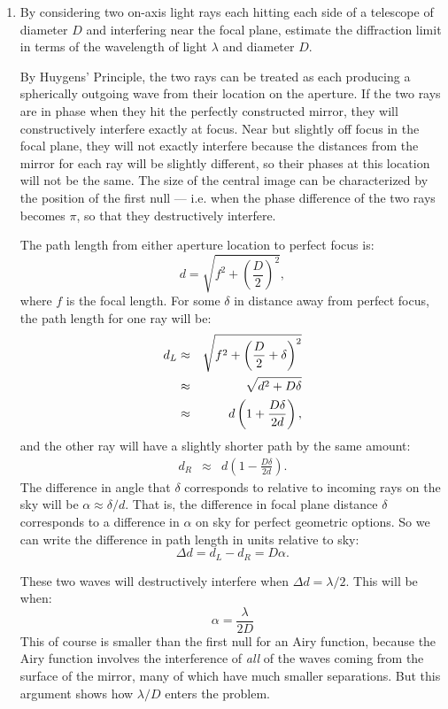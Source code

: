 \begin{enumerate} 
\item By considering two on-axis light rays each hitting each
    side of a telescope of diameter $D$ and interfering near the focal
    plane, estimate the diffraction limit in terms of the wavelength
    of light $\lambda$ and diameter $D$.

\begin{answer}
By Huygens' Principle, the two rays can be treated as each producing a
spherically outgoing wave from their location on the aperture. If the
two rays are in phase when they hit the perfectly constructed mirror,
they will constructively interfere exactly at focus. Near but slightly
off focus in the focal plane, they will not exactly interfere because
the distances from the mirror for each ray will be slightly different,
so their phases at this location will not be the same.  The size of
the central image can be characterized by the position of the first
null --- i.e. when the phase difference of the two rays becomes $\pi$,
so that they destructively interfere.

The path length from either aperture location to perfect focus is:
\begin{equation}
d = \sqrt{f^2 + \left(\frac{D}{2}\right)^2}, 
\end{equation}
where $f$ is the focal length.  For some $\delta$ in distance away
from perfect focus, the path length for one ray will be:
\begin{eqnarray}
d_L &\approx& \sqrt{f^2 + \left(\frac{D}{2} + \delta\right)^2} \cr
&\approx& \sqrt{d^2 + D\delta} \cr
&\approx& d \left(1 + \frac{D \delta}{2 d}\right),
\end{eqnarray}
and the other ray will have a slightly shorter path by the same
amount: 
\begin{eqnarray}
d_R &\approx& 
d \left(1 - \frac{D \delta}{2 d}\right).
\end{eqnarray}
The difference in angle that $\delta$ corresponds to relative to
incoming rays on the sky will be $\alpha \approx \delta / d$. That is,
the difference in focal plane distance $\delta$ corresponds to a
difference in $\alpha$ on sky for perfect geometric options. So we can
write the difference in path length in units relative to sky:
\begin{equation}
\Delta d = d_L - d_R = D \alpha.
\end{equation}

These two waves will destructively interfere when  $\Delta d = \lambda
/ 2$. This will be when:
\begin{equation}
\alpha = \frac{\lambda}{2 D}
\end{equation}
This of course is smaller than the first null for an Airy function,
because the Airy function involves the interference of {\it all} of
the waves coming from the surface of the mirror, many of which have
much smaller separations. But this argument shows how $\lambda/D$
enters the problem.
\end{answer}


\end{enumerate}
